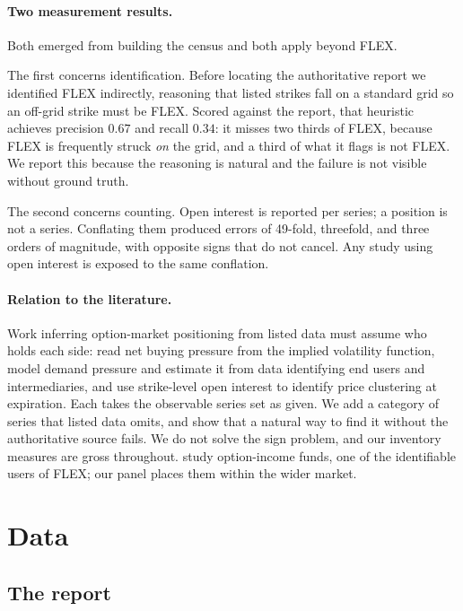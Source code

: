 \documentclass[11pt]{article}
\begin{document}
\paragraph{Two measurement results.} Both emerged from building the census and both
apply beyond FLEX.

The first concerns identification. Before locating the authoritative report we
identified FLEX indirectly, reasoning that listed strikes fall on a standard grid so an
off-grid strike must be FLEX. Scored against the report, that heuristic achieves
precision $0.67$ and recall $0.34$: it misses two thirds of FLEX, because FLEX is
frequently struck \emph{on} the grid, and a third of what it flags is not FLEX. We
report this because the reasoning is natural and the failure is not visible without
ground truth.

The second concerns counting. Open interest is reported per series; a position is not a
series. Conflating them produced errors of 49-fold, threefold, and three orders of
magnitude, with opposite signs that do not cancel. Any study using open interest is
exposed to the same conflation.

\paragraph{Relation to the literature.} Work inferring option-market positioning from
listed data must assume who holds each side: \citet{bollen2004} read net buying pressure
from the implied volatility function, \citet{garleanu2009} model demand pressure and
estimate it from data identifying end users and intermediaries, and \citet{ni2005} use
strike-level open interest to identify price clustering at expiration. Each takes the
observable series set as given. We add a category of series that listed data omits, and
show that a natural way to find it without the authoritative source fails. We do not
solve the sign problem, and our inventory measures are gross throughout.
\citet{park2025} study option-income funds, one of the identifiable users of FLEX; our
panel places them within the wider market.

\section{Data}

\subsection{The report}
\end{document}

